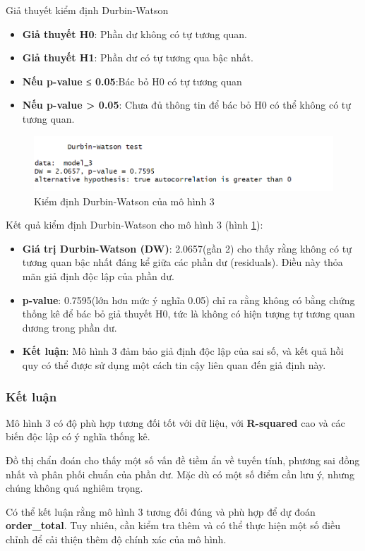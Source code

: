 Giả thuyết kiểm định Durbin-Watson
\begin{itemize}
  \item\textbf{Giả thuyết H0}: Phần  dư không có tự tương quan.
  \item\textbf{Giả thuyết H1}: Phần dư có tự tương qua bậc nhất.
  \item\textbf{Nếu p-value ≤ 0.05}:Bác bỏ H0 \rightarrow có tự tương quan
  \item\textbf{Nếu p-value > 0.05}: Chưa đủ thông tin để bác bỏ H0 \rightarrow có thể không có tự tương quan.
\end{itemize}

\begin{figure}[H]
  \centering
  \includegraphics[width=0.7\linewidth]{graphics/5.5.8.png}
  \caption{Kiểm định Durbin-Watson của mô hình 3 }
  \label{kd6}
\end{figure}

Kết quả kiểm định Durbin-Watson cho mô hình 3 (hình \ref{kd6}):
\begin{itemize}
  \item\textbf{Giá trị Durbin-Watson (DW)}: 2.0657(gần 2) cho thấy rằng không có tự tương quan bậc nhất đáng kể giữa các phần dư (residuals). Điều này thỏa mãn giả định độc lập của phần dư.
  \item \textbf{p-value}: 0.7595(lớn hơn mức ý nghĩa 0.05) chỉ ra rằng không có bằng chứng thống kê để bác bỏ giả thuyết H0, tức là không có hiện tượng tự tương quan dương trong phần dư.
  \item\textbf{Kết luận}:  Mô hình 3 đảm bảo giả định độc lập của sai số, và kết quả hồi quy có thể được sử dụng một cách tin cậy liên quan đến giả định này.
\end{itemize}

\subsubsection{Kết luận}

Mô hình 3 có độ phù hợp tương đối tốt với dữ liệu, với \textbf{R-squared} cao và các biến độc lập có ý nghĩa thống kê.

Đồ thị chẩn đoán cho thấy một số vấn đề tiềm ẩn về tuyến tính, phương sai đồng nhất và phân phối chuẩn của phần dư. Mặc dù có một số điểm cần lưu ý, nhưng chúng không quá nghiêm trọng.

Có thể kết luận rằng mô hình 3 tương đối đúng và phù hợp để dự đoán \textbf{order\_total}. Tuy nhiên, cần kiểm tra thêm và có thể thực hiện một số điều chỉnh để cải thiện thêm độ chính xác của mô hình.







